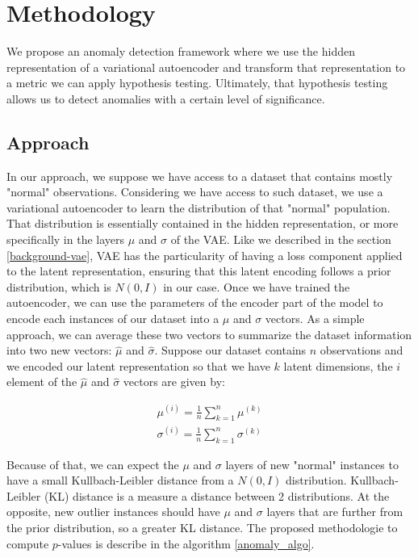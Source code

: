 \section{Methodology}

We propose an anomaly detection framework where we use the hidden representation of a variational autoencoder and transform that representation to a metric we can apply hypothesis testing. Ultimately, that hypothesis testing allows us to detect anomalies with a certain level of significance.

\subsection{Approach}

In our approach, we suppose we have access to a dataset that contains mostly "normal" observations. Considering we have access to such dataset, we use a variational autoencoder to learn the distribution of that "normal" population. That distribution is essentially contained in the hidden representation, or more specifically in the layers $\mu$ and $\sigma$ of the VAE. Like we described in the section \ref{background-vae}, VAE has the particularity of having a loss component applied to the latent representation, ensuring that this latent encoding follows a prior distribution, which is $N(0, I)$ in our case. Once we have trained the autoencoder, we can use the parameters of the encoder part of the model to encode each instances of our dataset into a $\mu$ and $\sigma$ vectors. As a simple approach, we can average these two vectors to summarize the dataset information into two new vectors: $\hat{\mu}$ and $\hat{\sigma}$. Suppose our dataset contains $n$ observations and we encoded our latent representation so that we have $k$ latent dimensions, the $i$ element of the $\hat{\mu}$ and $\hat{\sigma}$ vectors are given by:

\begin{gather*}
\mu^{(i)} = \frac{1}{n} \sum_{k=1}^{n} \mu^{(k)} \\
\sigma^{(i)} = \frac{1}{n} \sum_{k=1}^{n} \sigma^{(k)}
\end{gather*}


Because of that, we can expect the $\mu$ and $\sigma$ layers of new "normal" instances to have a small Kullbach-Leibler distance from a $N(0, I)$ distribution. Kullbach-Leibler (KL) distance is a measure a distance between 2 distributions. At the opposite, new outlier instances should have $\mu$ and $\sigma$ layers that are further from the prior distribution, so a greater KL distance. The proposed methodologie to compute $p$-values is describe in the algorithm \ref{anomaly_algo}.
\newline

